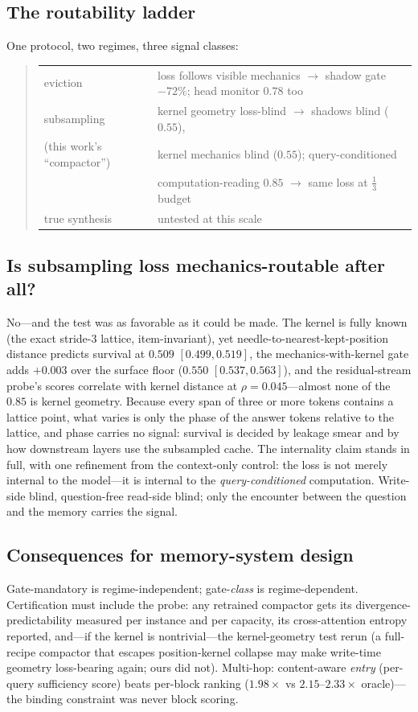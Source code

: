\documentclass[11pt]{article}
\begin{document}
\subsection{The routability ladder}
One protocol, two regimes, three signal classes:
\begin{quote}
\begin{tabularx}{\linewidth}{@{}lX@{}}
eviction & loss follows visible mechanics $\rightarrow$ shadow gate $-72\%$; head monitor $0.78$ too \\
subsampling & kernel geometry loss-blind $\rightarrow$ shadows blind ($0.55$), \\
(this work's ``compactor'') & kernel mechanics blind ($0.55$); query-conditioned \\
 & computation-reading $0.85$ $\rightarrow$ same loss at $\tfrac{1}{3}$ budget \\
true synthesis & untested at this scale \\
\end{tabularx}
\end{quote}

\subsection{Is subsampling loss mechanics-routable after all?}
No---and the test was as favorable as it could be made. The kernel is fully
known (the exact stride-3 lattice, item-invariant), yet
needle-to-nearest-kept-position distance predicts survival at $0.509$
$[0.499, 0.519]$, the mechanics-with-kernel gate adds $+0.003$ over the
surface floor ($0.550$ $[0.537, 0.563]$), and the residual-stream probe's
scores correlate with kernel distance at $\rho{=}0.045$---almost none of the
$0.85$ is kernel geometry. Because every span of three or more tokens
contains a lattice point, what varies is only the phase of the answer tokens
relative to the lattice, and phase carries no signal: survival is decided by
leakage smear and by how downstream layers use the subsampled cache. The
internality claim stands in full, with one refinement from the context-only
control: the loss is not merely internal to the model---it is internal to the
\emph{query-conditioned} computation. Write-side blind, question-free
read-side blind; only the encounter between the question and the memory
carries the signal.

\subsection{Consequences for memory-system design}
Gate-mandatory is regime-independent; gate-\emph{class} is regime-dependent.
Certification must include the probe: any retrained compactor gets its
divergence-predictability measured per instance and per capacity, its
cross-attention entropy reported, and---if the kernel is nontrivial---the
kernel-geometry test rerun (a full-recipe compactor that escapes
position-kernel collapse may make write-time geometry loss-bearing again;
ours did not). Multi-hop: content-aware \emph{entry} (per-query sufficiency
score) beats per-block ranking ($1.98\times$ vs $2.15$--$2.33\times$
oracle)---the binding constraint was never block scoring.
\end{document}
